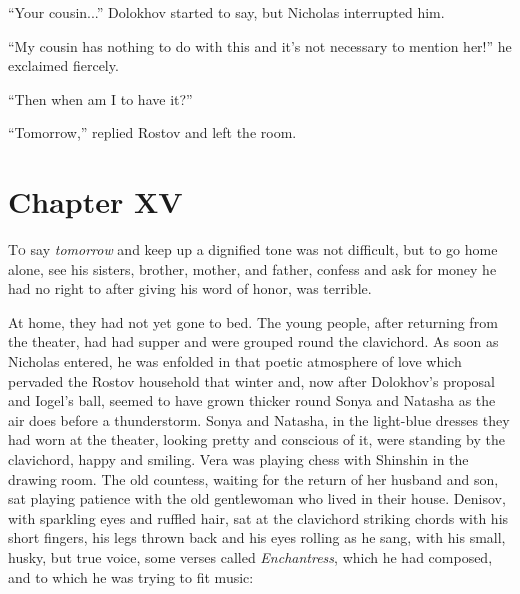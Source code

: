 ``Your cousin...'' Dolokhov started to say, but Nicholas
interrupted him.

``My cousin has nothing to do with this and it's not necessary to
mention her!'' he exclaimed fiercely.

``Then when am I to have it?''

``Tomorrow,'' replied Rostov and left the room.


\chapter*{Chapter XV}
\ifaudio     
{} 
\fi

\lettrine[lines=2, loversize=0.3, lraise=0]{\initfamily T}{o}
say \emph{tomorrow} and keep up a dignified tone was not
difficult, but to go home alone, see his sisters, brother,
mother, and father, confess and ask for money he had no right to
after giving his word of honor, was terrible.

At home, they had not yet gone to bed. The young people, after
returning from the theater, had had supper and were grouped round
the clavichord.  As soon as Nicholas entered, he was enfolded in
that poetic atmosphere of love which pervaded the Rostov
household that winter and, now after Dolokhov's proposal and
Iogel's ball, seemed to have grown thicker round Sonya and
Natasha as the air does before a thunderstorm. Sonya and Natasha,
in the light-blue dresses they had worn at the theater, looking
pretty and conscious of it, were standing by the clavichord,
happy and smiling. Vera was playing chess with Shinshin in the
drawing room. The old countess, waiting for the return of her
husband and son, sat playing patience with the old gentlewoman
who lived in their house. Denisov, with sparkling eyes and
ruffled hair, sat at the clavichord striking chords with his
short fingers, his legs thrown back and his eyes rolling as he
sang, with his small, husky, but true voice, some verses called
\emph{Enchantress}, which he had composed, and to which he was
trying to fit music:

